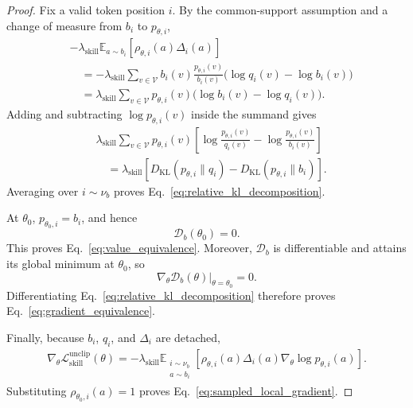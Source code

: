 \begin{proof}
Fix a valid token position \(i\). By the common-support assumption and a
change of measure from \(b_i\) to \(p_{\theta,i}\),
\begin{align*}
 &-
 \lambda_{\mathrm{skill}}
 \mathbb E_{a\sim b_i}
 \left[
   \rho_{\theta,i}(a)\Delta_i(a)
 \right]
 \\
 &\quad=
 -
 \lambda_{\mathrm{skill}}
 \sum_{v\in\mathcal V}
 b_i(v)
 \frac{p_{\theta,i}(v)}{b_i(v)}
 \bigl(
   \log q_i(v)-\log b_i(v)
 \bigr)
 \\
 &\quad=
 \lambda_{\mathrm{skill}}
 \sum_{v\in\mathcal V}
 p_{\theta,i}(v)
 \bigl(
   \log b_i(v)-\log q_i(v)
 \bigr).
\end{align*}
Adding and subtracting \(\log p_{\theta,i}(v)\) inside the summand gives
\begin{align*}
 &\lambda_{\mathrm{skill}}
 \sum_{v\in\mathcal V}
 p_{\theta,i}(v)
 \left[
   \log\frac{p_{\theta,i}(v)}{q_i(v)}
   -
   \log\frac{p_{\theta,i}(v)}{b_i(v)}
 \right]
 \\
 &\quad=
 \lambda_{\mathrm{skill}}
 \left[
   D_{\mathrm{KL}}(p_{\theta,i}\|q_i)
   -
   D_{\mathrm{KL}}(p_{\theta,i}\|b_i)
 \right].
\end{align*}
Averaging over \(i\sim\nu_b\) proves
Eq.~\ref{eq:relative_kl_decomposition}.

At \(\theta_0\), \(p_{\theta_0,i}=b_i\), and hence
\begin{equation*}
 \mathcal D_b(\theta_0)=0.
\end{equation*}
This proves Eq.~\ref{eq:value_equivalence}. Moreover,
\(\mathcal D_b\) is differentiable and attains its global minimum at
\(\theta_0\), so
\begin{equation*}
 \left.
 \nabla_\theta\mathcal D_b(\theta)
 \right|_{\theta=\theta_0}
 =0.
\end{equation*}
Differentiating Eq.~\ref{eq:relative_kl_decomposition} therefore proves
Eq.~\ref{eq:gradient_equivalence}.

Finally, because \(b_i\), \(q_i\), and \(\Delta_i\) are detached,
\begin{equation*}
\begin{aligned}
 \nabla_\theta
 \mathcal L_{\mathrm{skill}}^{\mathrm{unclip}}(\theta)
 =
 -
 \lambda_{\mathrm{skill}}
 \mathbb E_{\substack{i\sim\nu_b\\a\sim b_i}}
 \left[
   \rho_{\theta,i}(a)\Delta_i(a)
   \nabla_\theta\log p_{\theta,i}(a)
 \right].
\end{aligned}
\end{equation*}
Substituting
\(\rho_{\theta_0,i}(a)=1\) proves
Eq.~\ref{eq:sampled_local_gradient}.
\end{proof}


